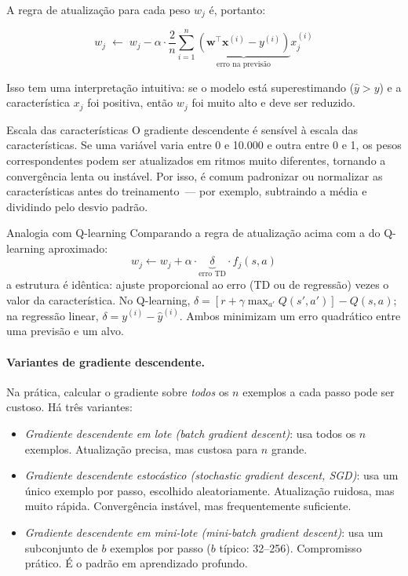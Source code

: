 \documentclass[12pt,a4paper]{article}
\begin{document}
A regra de atualização para cada peso $w_j$ é, portanto:

\[
w_j \;\leftarrow\; w_j - \alpha \cdot \frac{2}{n} \sum_{i=1}^n \underbrace{\left(\mathbf{w}^\top \mathbf{x}^{(i)} - y^{(i)}\right)}_{\text{erro na previsão}} x_j^{(i)}
\]

Isso tem uma interpretação intuitiva: se o modelo está superestimando ($\hat{y} > y$) e a característica $x_j$ foi positiva, então $w_j$ foi muito alto e deve ser reduzido.

\begin{notabox}{Escala das características}
O gradiente descendente é sensível à escala das características. Se uma variável varia entre 0 e 10.000 e outra entre 0 e 1, os pesos correspondentes podem ser atualizados em ritmos muito diferentes, tornando a convergência lenta ou instável. Por isso, é comum padronizar ou normalizar as características antes do treinamento~--- por exemplo, subtraindo a média e dividindo pelo desvio padrão.
\end{notabox}

\begin{notabox}{Analogia com Q-learning}
Comparando a regra de atualização acima com a do Q-learning aproximado:
\[
w_j \leftarrow w_j + \alpha \cdot \underbrace{\delta}_{\text{erro TD}} \cdot f_j(s,a)
\]
a estrutura é idêntica: ajuste proporcional ao erro (TD ou de regressão) vezes o valor da característica. No Q-learning, $\delta = [r + \gamma \max_{a'} Q(s',a')] - Q(s,a)$; na regressão linear, $\delta = y^{(i)} - \hat{y}^{(i)}$. Ambos minimizam um erro quadrático entre uma previsão e um alvo.
\end{notabox}

\paragraph{Variantes de gradiente descendente.}

Na prática, calcular o gradiente sobre \emph{todos} os $n$ exemplos a cada passo pode ser custoso. Há três variantes:

\begin{itemize}
    \item \emph{Gradiente descendente em lote (\textit{batch gradient descent})}: usa todos os $n$ exemplos. Atualização precisa, mas custosa para $n$ grande.
    \item \emph{Gradiente descendente estocástico (\textit{stochastic gradient descent}, SGD)}: usa um único exemplo por passo, escolhido aleatoriamente. Atualização ruidosa, mas muito rápida. Convergência instável, mas frequentemente suficiente.
    \item \emph{Gradiente descendente em mini-lote (\textit{mini-batch gradient descent})}: usa um subconjunto de $b$ exemplos por passo ($b$ típico: 32--256). Compromisso prático. É o padrão em aprendizado profundo.
\end{itemize}
\end{document}
